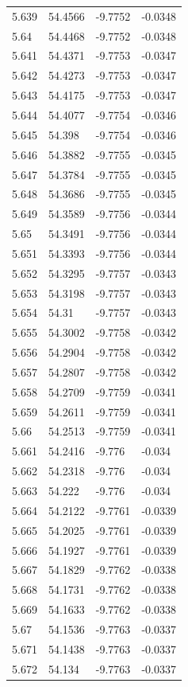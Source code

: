 \begin{tabular}{llll}
5.639 & 54.4566 & -9.7752 & -0.0348 \\
5.64 & 54.4468 & -9.7752 & -0.0348 \\
5.641 & 54.4371 & -9.7753 & -0.0347 \\
5.642 & 54.4273 & -9.7753 & -0.0347 \\
5.643 & 54.4175 & -9.7753 & -0.0347 \\
5.644 & 54.4077 & -9.7754 & -0.0346 \\
5.645 & 54.398 & -9.7754 & -0.0346 \\
5.646 & 54.3882 & -9.7755 & -0.0345 \\
5.647 & 54.3784 & -9.7755 & -0.0345 \\
5.648 & 54.3686 & -9.7755 & -0.0345 \\
5.649 & 54.3589 & -9.7756 & -0.0344 \\
5.65 & 54.3491 & -9.7756 & -0.0344 \\
5.651 & 54.3393 & -9.7756 & -0.0344 \\
5.652 & 54.3295 & -9.7757 & -0.0343 \\
5.653 & 54.3198 & -9.7757 & -0.0343 \\
5.654 & 54.31 & -9.7757 & -0.0343 \\
5.655 & 54.3002 & -9.7758 & -0.0342 \\
5.656 & 54.2904 & -9.7758 & -0.0342 \\
5.657 & 54.2807 & -9.7758 & -0.0342 \\
5.658 & 54.2709 & -9.7759 & -0.0341 \\
5.659 & 54.2611 & -9.7759 & -0.0341 \\
5.66 & 54.2513 & -9.7759 & -0.0341 \\
5.661 & 54.2416 & -9.776 & -0.034 \\
5.662 & 54.2318 & -9.776 & -0.034 \\
5.663 & 54.222 & -9.776 & -0.034 \\
5.664 & 54.2122 & -9.7761 & -0.0339 \\
5.665 & 54.2025 & -9.7761 & -0.0339 \\
5.666 & 54.1927 & -9.7761 & -0.0339 \\
5.667 & 54.1829 & -9.7762 & -0.0338 \\
5.668 & 54.1731 & -9.7762 & -0.0338 \\
5.669 & 54.1633 & -9.7762 & -0.0338 \\
5.67 & 54.1536 & -9.7763 & -0.0337 \\
5.671 & 54.1438 & -9.7763 & -0.0337 \\
5.672 & 54.134 & -9.7763 & -0.0337 \\

\end{tabular}
